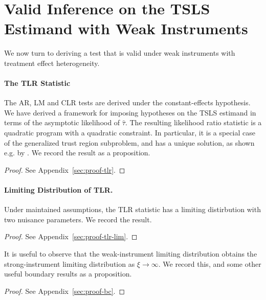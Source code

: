 \section{Valid Inference on the TSLS Estimand with Weak Instruments}
\label{sec:results}

We now turn to deriving a test that is valid under  weak instruments with treatment effect heterogeneity.

\paragraph*{The TLR Statistic}

The AR, LM and CLR tests are derived under the constant-effects hypothesis. We have derived a framework for imposing hypotheses on the TSLS estimand in terms of the asymptotic likelihood of \(\hat \tau\). The resulting likelihood ratio statistic is a quadratic program with a quadratic constraint. In particular, it is a special case of the generalized trust region subproblem, and has a unique solution, as shown e.g. by \cite{sternIndefiniteTrustRegion1995}. We record the result as a proposition.




\begin{proof}
    See Appendix~\ref{sec:proof-tlr}.
\end{proof}




\paragraph*{Limiting Distribution of TLR.}

Under maintained assumptions, the TLR statistic has a limiting distirbution with two nuisance parameters. We record the result.





\begin{proof}
    See Appendix~\ref{sec:proof-tlr-lim}.
\end{proof}
\noindent 
It is useful to observe that the weak-instrument limiting distribution  obtains the strong-instrument limiting distribution as \(\xi\to \infty\). We record this, and some other useful boundary results as a proposition.

\begin{proof}
    See Appendix~\ref{sec:proof-bc}.
\end{proof}
\noindent


